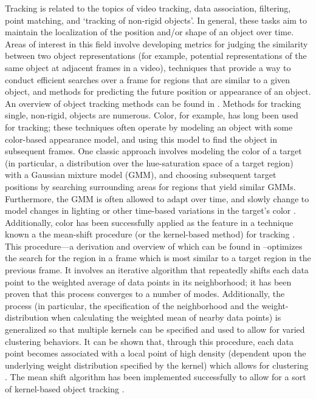 \documentclass[smallcondensed, final]{svjour3}
\begin{document}
Tracking is related to the topics of video tracking, data association, filtering, point matching, and `tracking of non-rigid objects'. In general, these tasks aim to maintain the localization of the position and/or shape of an object over time. Areas of interest in this field involve developing metrics for judging the similarity between two object representations (for example, potential representations of the same object at adjacent frames in a video), techniques that provide a way to conduct efficient searches over a frame for regions that are similar to a given object, and methods for predicting the future position or appearance of an object. An overview of object tracking methods can be found in \cite{yilmaz2006object}. Methods for tracking single, non-rigid, objects are numerous. Color, for example, has long been used for tracking; these techniques often operate by modeling an object with some color-based appearance model, and using this model to find the object in subsequent frames. One classic approach involves modeling the color of a target (in particular, a distribution over the hue-saturation space of a target region) with a Gaussian mixture model (GMM), and choosing subsequent target positions by searching surrounding areas for regions that yield similar GMMs. Furthermore, the GMM is often allowed to adapt over time, and slowly change to model changes in lighting or other time-based variations in the target's color \citep{raja_1998, mckenna_1999, jepson_2003}. Additionally, color has been successfully applied as the feature in a technique known a the mean-shift procedure (or the kernel-based method) for tracking \citep{comaniciu_2003, perez_2002, nummiaro_2003, lee_2011}. This procedure---a derivation and overview of which can be found in \citep{fukunaga_1975, cheng_1995}--optimizes the search for the region in a frame which is most similar to a target region in the previous frame. It involves an iterative algorithm that repeatedly shifts each data point to the weighted average of data points in its neighborhood; it has been proven that this process converges to a number of modes. Additionally, the process (in particular, the specification of the neighborhood and the weight-distribution when calculating the weighted mean of nearby data points) is generalized so that multiple kernels can be specified and used to allow for varied clustering behaviors. It can be shown that, through this procedure, each data point becomes associated with a local point of high density (dependent upon the underlying weight distribution specified by the kernel) which allows for clustering \citep{cheng_1995}. The mean shift algorithm has been implemented successfully to allow for a sort of kernel-based object tracking \citep{comaniciu_2003, comaniciu_1999, comaniciu_2000}.
\end{document}
